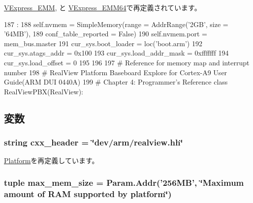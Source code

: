 \hyperlink{classRealView_1_1VExpress__EMM_a2bb8c2dabea2e4801ca416188787ef11}{VExpress\_\-EMM}, と \hyperlink{classRealView_1_1VExpress__EMM64_a2bb8c2dabea2e4801ca416188787ef11}{VExpress\_\-EMM64}で再定義されています。


\begin{DoxyCode}
187                                                     :
188         self.nvmem = SimpleMemory(range = AddrRange('2GB', size = '64MB'),
189                                   conf_table_reported = False)
190         self.nvmem.port = mem_bus.master
191         cur_sys.boot_loader = loc('boot.arm')
192         cur_sys.atags_addr = 0x100
193         cur_sys.load_addr_mask = 0xfffffff
194         cur_sys.load_offset = 0
195 
196 
197 # Reference for memory map and interrupt number
198 # RealView Platform Baseboard Explore for Cortex-A9 User Guide(ARM DUI 0440A)
199 # Chapter 4: Programmer's Reference
class RealViewPBX(RealView):
\end{DoxyCode}


\subsection{変数}
\hypertarget{classRealView_1_1RealView_a17da7064bc5c518791f0c891eff05fda}{
\subsubsection[{cxx\_\-header}]{\setlength{\rightskip}{0pt plus 5cm}string {\bf cxx\_\-header} = \char`\"{}dev/arm/realview.hh\char`\"{}}}
\label{classRealView_1_1RealView_a17da7064bc5c518791f0c891eff05fda}


\hyperlink{classPlatform_1_1Platform_a17da7064bc5c518791f0c891eff05fda}{Platform}を再定義しています。\hypertarget{classRealView_1_1RealView_af983c75b7dafe291aeab929eb0dc7656}{
\subsubsection[{max\_\-mem\_\-size}]{\setlength{\rightskip}{0pt plus 5cm}tuple {\bf max\_\-mem\_\-size} = {\bf Param.Addr}('256MB', \char`\"{}Maximum amount of RAM supported by platform\char`\"{})}}
\label{classRealView_1_1RealView_af983c75b7dafe291aeab929eb0dc7656}


